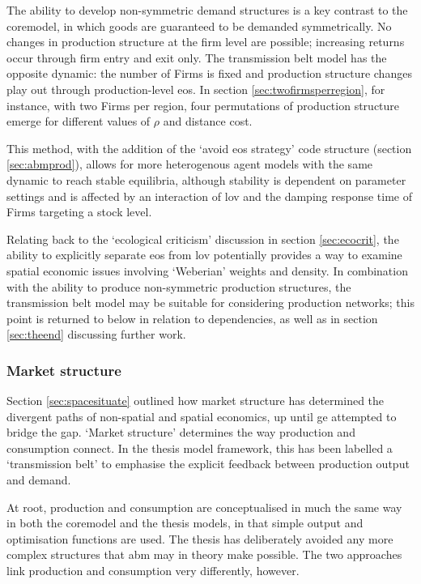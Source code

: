 The ability to develop non-symmetric demand structures is a key contrast to the \gls{coremodel}, in which goods are guaranteed to be demanded symmetrically. No changes in production structure at the firm level are possible; increasing returns occur through firm entry and exit only. The transmission belt model has the opposite dynamic: the number of Firms is fixed and production structure changes play out through production-level \gls{eos}. In section \ref{sec:twofirmsperregion}, for instance, with two Firms per region, four permutations of production structure emerge for different values of $\rho$ and distance cost.

This method, with the addition of the `avoid \gls{eos} strategy' code structure (section \ref{sec:abmprod}), allows for more heterogenous agent models with the same dynamic to reach stable equilibria, although stability is dependent on parameter settings and is affected by an interaction of \gls{lov} and the damping response time of Firms targeting a stock level.

Relating back to the `ecological criticism' discussion in section \ref{sec:ecocrit}, the ability to explicitly separate \gls{eos} from \gls{lov} potentially provides a way to examine spatial economic issues involving `Weberian' weights and density. In combination with the ability to produce non-symmetric production structures, the transmission belt model may be suitable for considering production networks; this point is returned to below in relation to dependencies, as well as in section \ref{sec:theend} discussing further work. 

\subsubsection{Market structure}

Section \ref{sec:spacesituate} outlined how market structure has determined the divergent paths of non-spatial and spatial economics, up until \gls{ge} attempted to bridge the gap. `Market structure' determines the way production and consumption connect. In the thesis model framework, this has been labelled a `transmission belt' to emphasise the explicit feedback between production output and demand. 

At root, production and consumption are conceptualised in much the same way in both the \gls{coremodel} and the thesis models, in that simple output and optimisation functions are used. The thesis has deliberately avoided any more complex structures that \gls{abm} may in theory make possible. The two approaches link production and consumption very differently, however. 

